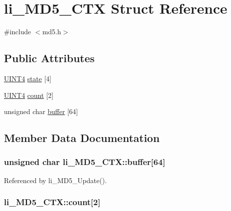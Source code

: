 \hypertarget{structli__MD5__CTX}{\section{li\-\_\-\-M\-D5\-\_\-\-C\-T\-X Struct Reference}
\label{structli__MD5__CTX}
}


{\ttfamily \#include $<$md5.\-h$>$}

\subsection*{Public Attributes}
\begin{DoxyCompactItemize}
\item 
\hyperlink{md5_8h_a53221f8e62504a7e8fc9331ef86423fd}{U\-I\-N\-T4} \hyperlink{structli__MD5__CTX_a4ced6c0f23c09f7eed962dca25afe418}{state} \mbox{[}4\mbox{]}
\item 
\hyperlink{md5_8h_a53221f8e62504a7e8fc9331ef86423fd}{U\-I\-N\-T4} \hyperlink{structli__MD5__CTX_ae7f74534a7e2df38c2cabc001aeb333a}{count} \mbox{[}2\mbox{]}
\item 
unsigned char \hyperlink{structli__MD5__CTX_a0ee43bec58bae75336f333e93e47f7db}{buffer} \mbox{[}64\mbox{]}
\end{DoxyCompactItemize}


\subsection{Member Data Documentation}
\hypertarget{structli__MD5__CTX_a0ee43bec58bae75336f333e93e47f7db}{
\subsubsection[{buffer}]{\setlength{\rightskip}{0pt plus 5cm}unsigned char li\-\_\-\-M\-D5\-\_\-\-C\-T\-X\-::buffer\mbox{[}64\mbox{]}}}\label{structli__MD5__CTX_a0ee43bec58bae75336f333e93e47f7db}


Referenced by li\-\_\-\-M\-D5\-\_\-\-Update().

\hypertarget{structli__MD5__CTX_ae7f74534a7e2df38c2cabc001aeb333a}{
\subsubsection[{count}]{ li\-\_\-\-M\-D5\-\_\-\-C\-T\-X\-::count\mbox{[}2\mbox{]}}}\label{structli__MD5__CTX_ae7f74534a7e2df38c2cabc001aeb333a}



